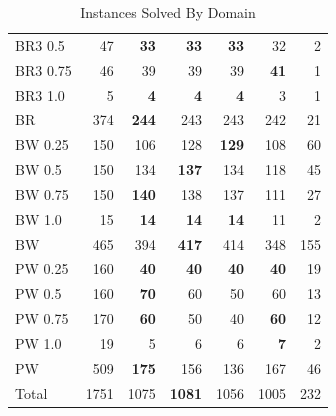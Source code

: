 \documentclass{article}
\begin{document}
\begin{table}
\begin{tabular}{|l|r|r@{ }r@{ }r@{ }r|r|}
BR3 0.5 	&		47		&	{\bf	33}	&	{\bf	33}	&	{\bf	33}	&		32		&	2	\\	
BR3 0.75 	&		46		&		39		&		39		&		39		&	{\bf	41}	&	1	\\	
BR3 1.0 	&		5		&	{\bf	4}	&	{\bf	4}	&	{\bf	4}	&		3		&	1	\\	\hline
BR 	&		374		&	{\bf	244}	&		243		&		243		&		242		&	21	\\	\hline\hline
BW 0.25 	&		150		&		106		&		128		&	{\bf	129}	&		108		&	60	\\	
BW 0.5 	&		150		&		134		&	{\bf	137}	&		134		&		118		&	45	\\	
BW 0.75 	&		150		&	{\bf	140}	&		138		&		137		&		111		&	27	\\	
BW 1.0 	&		15		&	{\bf	14}	&	{\bf	14}	&	{\bf	14}	&		11		&	2	\\	\hline
BW 	&		465		&		394		&	{\bf	417}	&		414		&		348		&	155	\\	\hline\hline
PW 0.25 	&		160		&	{\bf	40}	&	{\bf	40}	&	{\bf	40}	&	{\bf	40}	&	19	\\	
PW 0.5 	&		160		&	{\bf	70}	&		60		&		50		&		60		&	13	\\	
PW 0.75 	&		170		&	{\bf	60}	&		50		&		40		&	{\bf	60}	&	12	\\	
PW 1.0 	&		19		&		5		&		6		&		6		&	{\bf	7}	&	2	\\	\hline
PW 	&		509		&	{\bf	175}	&		156		&		136		&		167		&	46	\\	\hline\hline
Total	&		1751		&		1075		&	{\bf	1081}	&		1056		&		1005		&	232	\\	
\hline																								
\end{tabular}	\caption{\label{tab:solved} Instances Solved By Domain}																							
\end{table}																																												
\end{document}
